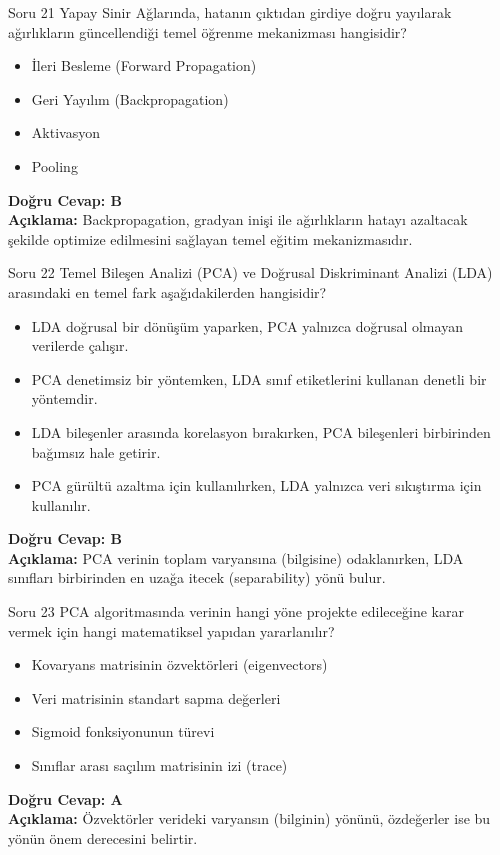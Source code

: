 \documentclass[12pt,a4paper]{article}
\begin{document}
\begin{testcard}{Soru 21}
    Yapay Sinir Ağlarında, hatanın çıktıdan girdiye doğru yayılarak ağırlıkların güncellendiği temel öğrenme mekanizması hangisidir?
    \begin{itemize}
        \item[A)] İleri Besleme (Forward Propagation)
        \item[B)] Geri Yayılım (Backpropagation)
        \item[C)] Aktivasyon
        \item[D)] Pooling
    \end{itemize}
    \tcblower
    \textbf{Doğru Cevap: B} \\
    \textbf{Açıklama:} Backpropagation, gradyan inişi ile ağırlıkların hatayı azaltacak şekilde optimize edilmesini sağlayan temel eğitim mekanizmasıdır.
\end{testcard}

\begin{testcard}{Soru 22}
    Temel Bileşen Analizi (PCA) ve Doğrusal Diskriminant Analizi (LDA) arasındaki en temel fark aşağıdakilerden hangisidir?
    \begin{itemize}
        \item[A)] LDA doğrusal bir dönüşüm yaparken, PCA yalnızca doğrusal olmayan verilerde çalışır.
        \item[B)] PCA denetimsiz bir yöntemken, LDA sınıf etiketlerini kullanan denetli bir yöntemdir.
        \item[C)] LDA bileşenler arasında korelasyon bırakırken, PCA bileşenleri birbirinden bağımsız hale getirir.
        \item[D)] PCA gürültü azaltma için kullanılırken, LDA yalnızca veri sıkıştırma için kullanılır.
    \end{itemize}
    \tcblower
    \textbf{Doğru Cevap: B} \\
    \textbf{Açıklama:} PCA verinin toplam varyansına (bilgisine) odaklanırken, LDA sınıfları birbirinden en uzağa itecek (separability) yönü bulur.
\end{testcard}

\begin{testcard}{Soru 23}
    PCA algoritmasında verinin hangi yöne projekte edileceğine karar vermek için hangi matematiksel yapıdan yararlanılır?
    \begin{itemize}
        \item[A)] Kovaryans matrisinin özvektörleri (eigenvectors)
        \item[B)] Veri matrisinin standart sapma değerleri
        \item[C)] Sigmoid fonksiyonunun türevi
        \item[D)] Sınıflar arası saçılım matrisinin izi (trace)
    \end{itemize}
    \tcblower
    \textbf{Doğru Cevap: A} \\
    \textbf{Açıklama:} Özvektörler verideki varyansın (bilginin) yönünü, özdeğerler ise bu yönün önem derecesini belirtir.
\end{testcard}
\end{document}
